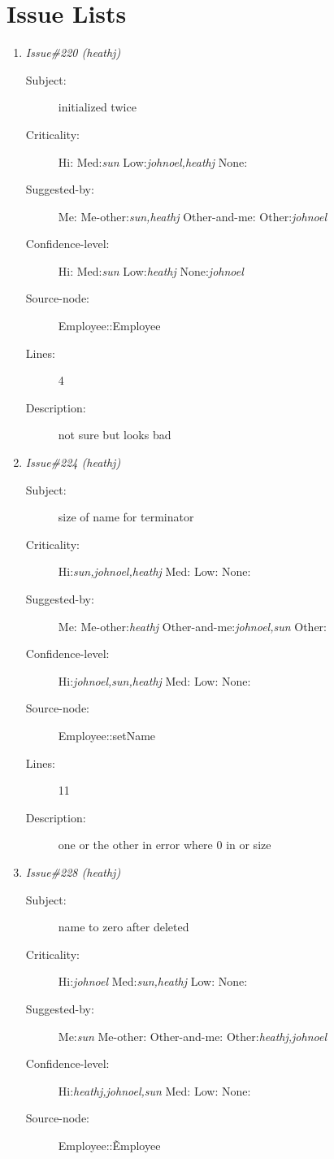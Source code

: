 \section{Issue Lists}
\begin{enumerate}
\item {\it Issue\#220 (heathj)}
\begin{description}
\item [Subject:] initialized twice
\item [Criticality:] Hi:{\it } Med:{\it sun} Low:{\it johnoel,heathj} None:{\it }
\item [Suggested-by:] Me:{\it } Me-other:{\it sun,heathj} Other-and-me:{\it } Other:{\it johnoel}
\item [Confidence-level:] Hi:{\it } Med:{\it sun} Low:{\it heathj} None:{\it johnoel}
\item [Source-node:] Employee::Employee

\item [Lines:] 4

\item [Description:] not sure but looks bad
\end{description}
\item {\it Issue\#224 (heathj)}
\begin{description}
\item [Subject:] size of name for terminator
\item [Criticality:] Hi:{\it sun,johnoel,heathj} Med:{\it } Low:{\it } None:{\it }
\item [Suggested-by:] Me:{\it } Me-other:{\it heathj} Other-and-me:{\it johnoel,sun} Other:{\it }
\item [Confidence-level:] Hi:{\it johnoel,sun,heathj} Med:{\it } Low:{\it } None:{\it }
\item [Source-node:] Employee::setName

\item [Lines:] 11

\item [Description:] one or the other in error where 0 in or size
\end{description}
\item {\it Issue\#228 (heathj)}
\begin{description}
\item [Subject:] name to zero after deleted
\item [Criticality:] Hi:{\it johnoel} Med:{\it sun,heathj} Low:{\it } None:{\it }
\item [Suggested-by:] Me:{\it sun} Me-other:{\it } Other-and-me:{\it } Other:{\it heathj,johnoel}
\item [Confidence-level:] Hi:{\it heathj,johnoel,sun} Med:{\it } Low:{\it } None:{\it }
\item [Source-node:] Employee::\~Employee


\end{description}
\end{enumerate}
